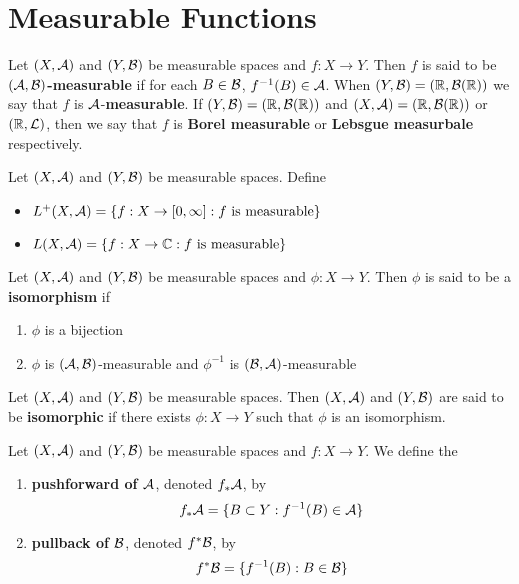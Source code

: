 \documentclass{book}
\begin{document}
	\newpage
	\section{Measurable Functions}
	
	\begin{defn}  
		Let $(X,\mathcal{A})$ and $(Y, \mathcal{B})$ be measurable spaces and $f:X \rightarrow Y$. Then $f$ is said to be \textbf{$(\mathcal{A},\mathcal{B})$-measurable} if for each $B \in \mathcal{B}$, $f^{-1}(B) \in \mathcal{A}$. When $(Y, \mathcal{B}) = (\mathbb{R}, \mathcal{B}(\mathbb{R}))$ we say that $f$ is $\mathcal{A}$-\textbf{measurable}. If $(Y,\mathcal{B}) = (\mathbb{R}, \mathcal{B}(\mathbb{R}))$ and $(X,\mathcal{A}) = (\mathbb{R}, \mathcal{B}(\mathbb{R}))$ or $(\mathbb{R}, \mathcal{L})$, then we say that $f$ is \textbf{Borel measurable} or \textbf{Lebsgue measurbale} respectively.
	\end{defn}
	
	\begin{defn}  
		Let $(X, \mathcal{A})$ and $(Y, \mathcal{B})$ be measurable spaces. Define 
		\begin{itemize}
			\item $L^{+}(X, \mathcal{A}) = \{f:X \rightarrow [0,\infty] : f \text{ is measurable}\}$
			\item $L(X, \mathcal{A}) = \{f:X \rightarrow \mathbb{C} : f \text{ is measurable}\}$ 
		\end{itemize}
	\end{defn}
	
	\begin{defn} 
		Let $(X, \mathcal{A})$ and $(Y, \mathcal{B})$ be measurable spaces and $\phi: X \rightarrow Y$. Then $\phi$ is said to be a \textbf{isomorphism} if 
		\begin{enumerate}
			\item $\phi$ is a bijection
			\item $\phi$ is $(\mathcal{A}, \mathcal{B})$-measurable and $\phi^{-1}$ is $(\mathcal{B}, \mathcal{A})$-measurable
		\end{enumerate}
	\end{defn}

	\begin{defn} 
		Let $(X, \mathcal{A})$ and $(Y, \mathcal{B})$ be measurable spaces. Then $(X, \mathcal{A})$ and $(Y, \mathcal{B})$ are said to be \textbf{isomorphic} if there exists $\phi:X \rightarrow Y$ such that $\phi$ is an isomorphism.
	\end{defn}
	
	\begin{defn} 
		Let $(X, \mathcal{A})$ and $(Y,\mathcal{B})$ be measurable spaces and $f: X \rightarrow Y$. We define the 
		\begin{enumerate}
			\item \textbf{pushforward of $\mathcal{A}$}, denoted $f_*\mathcal{A}$, by 
			$$f_*\mathcal{A} = \{B \subset Y: f^{-1}(B) \in \mathcal{A}\}$$ 
			\item  \textbf{pullback of $\mathcal{B}$}, denoted $f^*\mathcal{B}$, by  
			$$f^*\mathcal{B} = \{f^{-1}(B):  B \in \mathcal{B} \}$$
		\end{enumerate}
	\end{defn}
	
\end{document}
